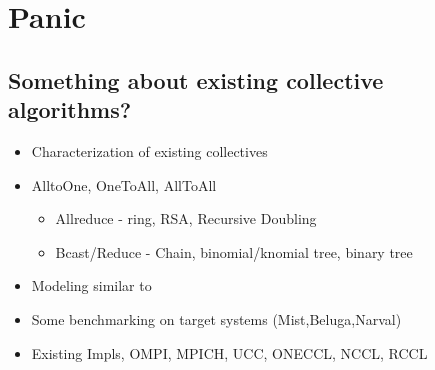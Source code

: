 
\glsresetall %
\chapter[Panic]{Panic}\label{ch:Panic}

\section{Something about existing collective algorithms?}
\begin{itemize}
	\item{Characterization of existing collectives}
	\item{AlltoOne, OneToAll, AllToAll}
    \begin{itemize}
        \item{Allreduce - ring, RSA, Recursive Doubling}
        \item{Bcast/Reduce - Chain, binomial/knomial tree, binary tree}
    \end{itemize}
    \item{Modeling similar to \cite{Thakur2005OptMPICH}}
    \item{Some benchmarking on target systems (Mist,Beluga,Narval)}
    \item{Existing Impls, OMPI, MPICH, UCC, ONECCL, NCCL, RCCL}
\end{itemize}

\clearpage